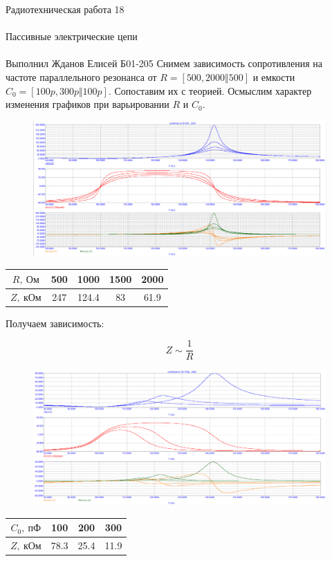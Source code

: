 \documentclass{astroedu-lab}
\begin{document}
\begin{problem}{\huge Радиотехническая работа 18\\\\Пассивные электрические цепи\\\\Выполнил Жданов Елисей Б01-205}
Снимем зависимость сопротивления на частоте параллельного резонанса от $R = [500, 2000 \Vert 500]$ и емкости $C_0 = [100p, 300p \Vert 100p]$. Сопоставим их с теорией. Осмыслим характер изменения графиков при варьировании $R$ и $C_0$.

\begin{figure}[h!]
\centering
\includegraphics[scale=0.4]{combined_AC2.png}
\label{fig:Image1}
\end{figure}

\begin{center}
\begin{tabular}{|c|c|c|c|c|}
\hline 
$R, \: \text{Ом}$ & 500 & 1000 & 1500 & 2000 \\ 
\hline 
$Z, \: \text{кОм}$ & 247 & 124.4 & 83 & 61.9 \\ 
\hline 
\end{tabular} 
\end{center}

Получаем зависимость:

\[Z \sim \frac{1}{R}\]

\begin{figure}[h!]
\centering
\includegraphics[scale=0.4]{combined_AC3.png}
\label{fig:Image1}
\end{figure}

\begin{center}
\begin{tabular}{|c|c|c|c|}
\hline 
$C_0, \: \text{пФ}$ & 100 & 200 & 300 \\ 
\hline 
$Z, \: \text{кОм}$ & 78.3 & 25.4 & 11.9 \\ 
\hline 
\end{tabular} 
\end{center}


\end{problem}
\end{document}
